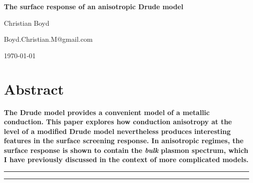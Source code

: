 \begin{center}{\Large \textbf{
The surface response of an anisotropic Drude model
}}\end{center}

\begin{center}
Christian Boyd
\end{center}

\begin{center}
{\small \sf Boyd.Christian.M@gmail.com}
\end{center}

\begin{center}
\today
\end{center}


\section*{Abstract}
{\bf
The Drude model provides a convenient model of a metallic conduction.  This paper explores how conduction anisotropy at the level of a modified Drude model nevertheless produces interesting features in the surface screening response.  In anisotropic regimes, the surface response is shown to contain the {\it bulk} plasmon spectrum, which I have previously discussed in the context of more complicated models.
}

\vspace{10pt}
\noindent\rule{\textwidth}{1pt}
\tableofcontents
\noindent\rule{\textwidth}{1pt}
\vspace{10pt}